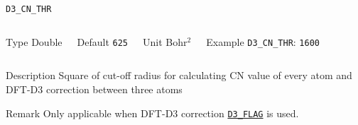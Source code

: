\documentclass[xcolor=dvipsnames,t]{beamer}
\begin{document}
\begin{frame}[allowframebreaks]{\texttt{D3\_CN\_THR}} \label{D3_CN_THR}
\vspace*{-12pt}
\begin{columns}
\begin{block}{Type}
Double
\end{block}

\begin{block}{Default}
\texttt{625}
\end{block}

\begin{block}{Unit}
Bohr$^2$
\end{block}

\begin{block}{Example}
\texttt{D3\_CN\_THR}: \texttt{1600}
\end{block}
\end{columns}

\begin{block}{Description}
Square of cut-off radius for calculating CN value of every atom and DFT-D3 correction between three atoms
\end{block}

\begin{block}{Remark}
Only applicable when DFT-D3 correction \hyperlink{D3_FLAG}{\texttt{D3\_FLAG}} is used.
\end{block}

\end{frame}
\end{document}
